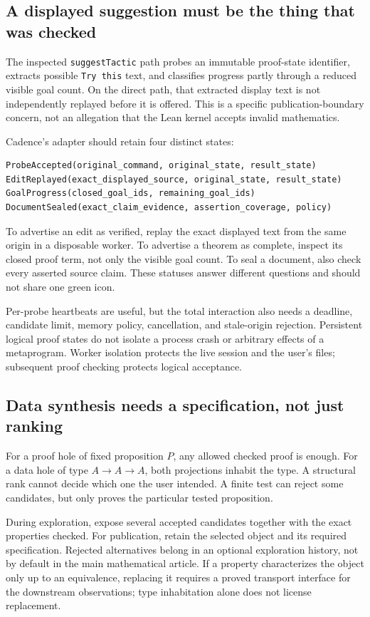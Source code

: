 \documentclass[11pt,letterpaper]{article}
\newcommand{\code}[1]{\nolinkurl{#1}}
\theoremstyle{definition}
\begin{document}
\subsection{A displayed suggestion must be the thing that was checked}
The inspected \code{suggestTactic} path probes an immutable proof-state identifier,
extracts possible \code{Try this} text, and classifies progress partly through a
reduced visible goal count. On the direct path, that extracted display text is not
independently replayed before it is offered\cite{lmain}. This is a specific
publication-boundary concern, not an allegation that the Lean kernel accepts
invalid mathematics.

Cadence's adapter should retain four distinct states:
\begin{lstlisting}
ProbeAccepted(original_command, original_state, result_state)
EditReplayed(exact_displayed_source, original_state, result_state)
GoalProgress(closed_goal_ids, remaining_goal_ids)
DocumentSealed(exact_claim_evidence, assertion_coverage, policy)
\end{lstlisting}

To advertise an edit as verified, replay the exact displayed text from the same
origin in a disposable worker. To advertise a theorem as complete, inspect its
closed proof term, not only the visible goal count. To seal a document, also check
every asserted source claim. These statuses answer different questions and should
not share one green icon.

Per-probe heartbeats are useful, but the total interaction also needs a deadline,
candidate limit, memory policy, cancellation, and stale-origin rejection. Persistent
logical proof states do not isolate a process crash or arbitrary effects of a
metaprogram. Worker isolation protects the live session and the user's files;
subsequent proof checking protects logical acceptance.

\subsection{Data synthesis needs a specification, not just ranking}
For a proof hole of fixed proposition \(P\), any allowed checked proof is enough.
For a data hole of type \(A\to A\to A\), both projections inhabit the type.
A structural rank cannot decide which one the user intended. A finite test can
reject some candidates, but only proves the particular tested proposition.

During exploration, expose several accepted candidates together with the exact
properties checked. For publication, retain the selected object and its required
specification. Rejected alternatives belong in an optional exploration history,
not by default in the main mathematical article. If a property characterizes the
object only up to an equivalence, replacing it requires a proved transport
interface for the downstream observations; type inhabitation alone does not
license replacement.
\end{document}
